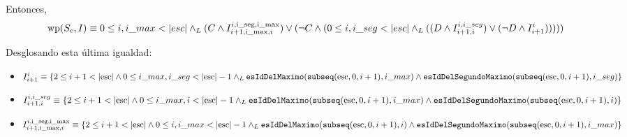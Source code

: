 \documentclass[10pt,a4paper]{article}
\newcommand{\predRef}{\texttt}
\newcommand{\var}{\text}
\renewcommand{\wp}{\text{wp}}
\begin{document}
\begin{enumerate}
    Entonces,
    $$\wp(S_c, I) \equiv 0 \leq i, i\_max < |esc| \yLuego (C \land I_{i+1, \var{i\_max}, i}^{i, \var{i\_seg}, \var{i\_max}}) \lor (\neg C \land (0 \leq i, i\_seg < |esc| \yLuego ((D \land I_{i+1,i}^{i,i\_seg}) \lor (\neg D \land I_{i+1}^i)))))$$

    Desglosando esta última igualdad:    
    \begin{itemize}
        \item $I_{i+1}^{i} \equiv \{2 \leq i + 1 < |\var{esc}| \land 0 \leq i\_max, i\_seg < |\var{esc}| - 1 \yLuego\\ \predRef{esIdDelMaximo}(\predRef{subseq}(\var{esc}, 0, i + 1), i\_max) \land\\ \predRef{esIdDelSegundoMaximo}(\predRef{subseq}(\var{esc}, 0, i + 1), i\_seg)\}$
        \item $I_{i+1,i}^{i,i\_seg} \equiv \{2 \leq i + 1 < |\var{esc}| \land 0 \leq i\_max, i < |\var{esc}| - 1 \yLuego\\ \predRef{esIdDelMaximo}(\predRef{subseq}(\var{esc}, 0, i + 1), i\_max) \land\\ \predRef{esIdDelSegundoMaximo}(\predRef{subseq}(\var{esc}, 0, i + 1), i)\}$
        \item $I_{i+1, \var{i\_max}, i}^{i, \var{i\_seg}, \var{i\_max}} \equiv \{2 \leq i + 1 < |\var{esc}| \land 0 \leq i, i\_max < |\var{esc}| - 1 \yLuego\\ \predRef{esIdDelMaximo}(\predRef{subseq}(\var{esc}, 0, i + 1), i) \land\\ \predRef{esIdDelSegundoMaximo}(\predRef{subseq}(\var{esc}, 0, i + 1), i\_max)\}$
    \end{itemize}


\end{enumerate}
\end{document}
